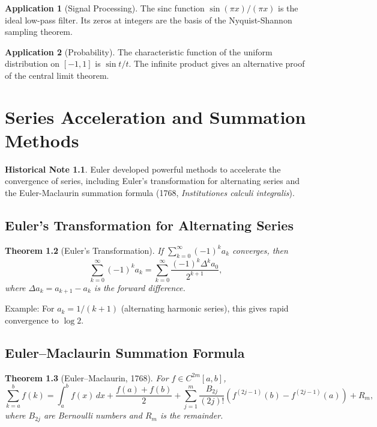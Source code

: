 \documentclass[11pt,a4paper,twoside]{book}
\theoremstyle{eulerstyle}
\newtheorem{theorem}{Theorem}[chapter]
\theoremstyle{definition}
\newtheorem{historical}[theorem]{Historical Note}
\newtheorem{application}[theorem]{Application}
\begin{document}
\begin{application}[Signal Processing]
The sinc function $\sin(\pi x)/(\pi x)$ is the ideal low-pass filter. Its zeros at integers are the basis of the Nyquist-Shannon sampling theorem.
\end{application}

\begin{application}[Probability]
The characteristic function of the uniform distribution on $[-1,1]$ is $\sin t / t$. The infinite product gives an alternative proof of the central limit theorem.
\end{application}

\cleardoublepage

\chapter{Series Acceleration and Summation Methods}
\label{ch:acceleration}

\begin{historical}
Euler developed powerful methods to accelerate the convergence of series, including Euler's transformation for alternating series and the Euler-Maclaurin summation formula (1768, \emph{Institutiones calculi integralis}). \cite{euler1768}\end{historical}

\section{Euler's Transformation for Alternating Series}

\begin{theorem}[Euler's Transformation]
If $\sum_{k=0}^\infty (-1)^k a_k$ converges, then
\[
\sum_{k=0}^\infty (-1)^k a_k = \sum_{k=0}^\infty \frac{(-1)^k \Delta^k a_0}{2^{k+1}},
\]
where $\Delta a_k = a_{k+1} - a_k$ is the forward difference.
\end{theorem}

Example: For $a_k = 1/(k+1)$ (alternating harmonic series), this gives rapid convergence to $\log 2$.

\section{Euler--Maclaurin Summation Formula}

\begin{theorem}[Euler--Maclaurin, 1768]
For $f \in C^{2m}[a,b]$,
\[
\sum_{k=a}^b f(k) = \int_a^b f(x)\,dx + \frac{f(a)+f(b)}{2} 
+ \sum_{j=1}^m \frac{B_{2j}}{(2j)!} \left( f^{(2j-1)}(b) - f^{(2j-1)}(a) \right) + R_m,
\]
where $B_{2j}$ are Bernoulli numbers and $R_m$ is the remainder.
\end{theorem}
\end{document}
